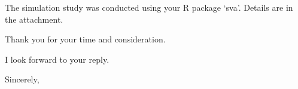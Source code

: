 \documentclass{letter}
\begin{document}
\begin{letter}
The simulation study was conducted using your R package `sva'. Details are in the attachment.


Thank you for your time and consideration.

I look forward to your reply.

\vspace{2\parskip} %
\closing{Sincerely,}
\vspace{2\parskip} %







\end{letter}

 
\end{document}
